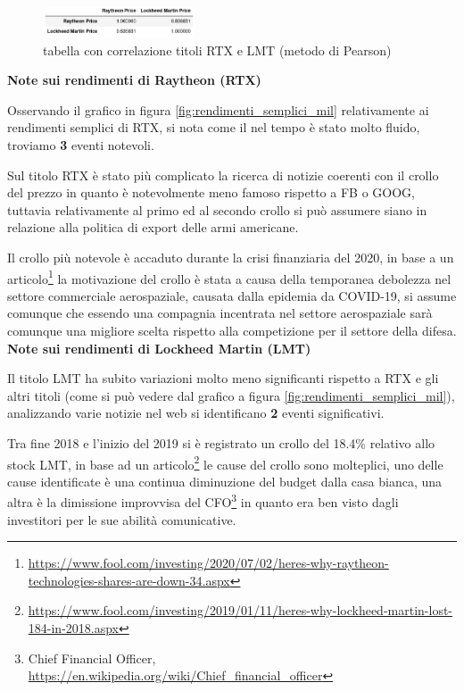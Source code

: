 \documentclass{article}
\begin{document}
\begin{figure}[h]
  \centering
  \includegraphics[width=0.4\textwidth]{corr_mil.png}
  \caption{tabella con correlazione titoli RTX e LMT (metodo di Pearson)}
  \label{fig:corr_mill}
\end{figure}

\textbf{Note sui rendimenti di Raytheon (RTX)}

Osservando il grafico in figura \ref{fig:rendimenti_semplici_mil} relativamente ai rendimenti semplici di RTX, si nota come il nel tempo è
stato molto fluido, troviamo \textbf{3} eventi notevoli.

Sul titolo RTX è stato più complicato la ricerca di notizie coerenti con il crollo del prezzo in quanto è notevolmente meno famoso rispetto a FB o GOOG,
tuttavia relativamente al primo ed al secondo crollo si può assumere siano in relazione alla politica di export delle armi americane.

Il crollo più notevole è accaduto durante la crisi finanziaria del 2020, in base a un 
articolo\footnote{
  \href{https://www.fool.com/investing/2020/07/02/heres-why-raytheon-technologies-shares-are-down-34.aspx}{https://www.fool.com/investing/2020/07/02/heres-why-raytheon-technologies-shares-are-down-34.aspx}
}
la motivazione del crollo è stata a causa della temporanea debolezza nel settore commerciale aerospaziale, causata dalla epidemia da COVID-19,
si assume comunque che essendo una compagnia incentrata nel settore aerospaziale sarà comunque una migliore scelta rispetto alla competizione per il
settore della difesa.\\

\textbf{Note sui rendimenti di Lockheed Martin (LMT)}

Il titolo LMT ha subito variazioni molto meno significanti rispetto a RTX e gli altri titoli (come si può vedere dal grafico a figura \ref{fig:rendimenti_semplici_mil}), analizzando varie notizie nel web si identificano \textbf{2} eventi significativi.

Tra fine 2018 e l'inizio del 2019 si è registrato un crollo del 18.4\% relativo allo stock LMT, in base ad un 
articolo\footnote{
  \href{https://www.fool.com/investing/2019/01/11/heres-why-lockheed-martin-lost-184-in-2018.aspx}{https://www.fool.com/investing/2019/01/11/heres-why-lockheed-martin-lost-184-in-2018.aspx}
}
le cause del crollo sono molteplici, uno delle cause identificate è una continua diminuzione del budget dalla casa bianca, una altra è la dimissione improvvisa del 
CFO\footnote{
  Chief Financial Officer, \href{https://en.wikipedia.org/wiki/Chief_financial_officer}{https://en.wikipedia.org/wiki/Chief\_financial\_officer}
}
in quanto era ben visto dagli investitori per le sue abilità comunicative.
\end{document}
